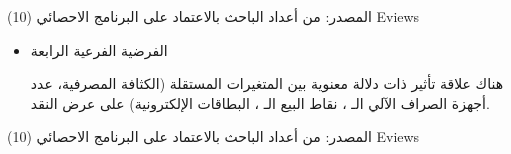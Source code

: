 \documentclass[10pt,a4paper]{report}
\begin{document}
\begin{doublespacing}
المصدر: من أعداد الباحث بالاعتماد على البرنامج الاحصائي (10) Eviews
\begin{itemize}
\item الفرضية الفرعية الرابعة

هناك علاقة تأثير ذات دلالة معنوية بين المتغيرات المستقلة (الكثافة المصرفية، عدد أجهزة الصراف الآلي الـ ، نقاط البيع الـ ، البطاقات الإلكترونية) على عرض النقد.
\end{itemize}
المصدر: من أعداد الباحث بالاعتماد على البرنامج الاحصائي (10) Eviews
\begin{table}[H]
	\captionsetup{font=Large}  %
	\fontsize{12}{12}\selectfont
	\centering
	\caption{قيم نموذج الانحدار لمتغير البحث (عرض النقد)}
	\label{tab:23.3}
\end{table}
\end{doublespacing}
\end{document}
